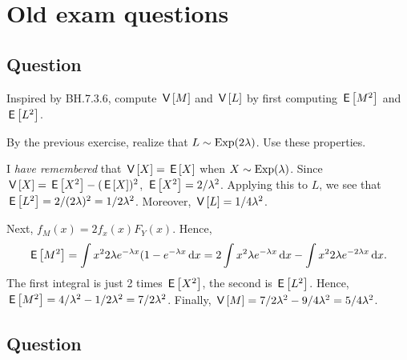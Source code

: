 



\chapter{Old  exam questions}


\section{Question}
\label{sec:question-1}

\begin{exercise}
Inspired by BH.7.3.6, compute $\,\mathsf{V}\left[M\right]$ and $\,\mathsf{V}\left[L\right]$ by first computing $\,\mathsf{E}\left[M^{2}\right]$ and $\,\mathsf{E}\left[L^{2}\right]$.
\begin{hint}
By the previous exercise, realize that $L\sim\mathrm{Exp}(2\lambda)$.  Use these properties.
\end{hint}
\begin{solution}
I \emph{have remembered} that $\,\mathsf{V}\left[X\right] = \,\mathsf{E}\left[X\right]$ when $X\sim \mathrm{Exp}(\lambda)$. Since $\,\mathsf{V}\left[X\right] = \,\mathsf{E}\left[X^{2}\right] - (\,\mathsf{E}\left[X\right])^{2}$, $\,\mathsf{E}\left[X^2\right]=2/\lambda^{2}$. Applying this to $L$, we see that $\,\mathsf{E}\left[L^2\right] = 2/(2\lambda)^{2} = 1/2\lambda^{2}$. Moreover, $\,\mathsf{V}\left[L\right] = 1/4\lambda^{2}$.

Next, $f_M(x) = 2 f_x(x) F_Y(x)$. Hence,
\begin{equation*}
\,\mathsf{E}\left[M^2\right] = \int x^2 2 \lambda e^{-\lambda x} (1-e^{-\lambda x}\,\textrm{d}x = 2 \int x^2  \lambda e^{-\lambda x} \,\textrm{d}x - \int x^{2} 2 \lambda e^{-2\lambda x}\,\textrm{d}x.
\end{equation*}
The first integral is just 2 times $\,\mathsf{E}\left[X^{2}\right]$, the second is $\,\mathsf{E}\left[L^2\right]$. Hence, $\,\mathsf{E}\left[M^2\right]=4/\lambda^2-1/2\lambda^2= 7/2\lambda^{2}$. Finally, $\,\mathsf{V}\left[M\right] = 7/2\lambda^2 - 9/4\lambda^2= 5/4\lambda^{2}$.
\end{solution}
\end{exercise}



\section{Question}
\label{sec:question-2}


